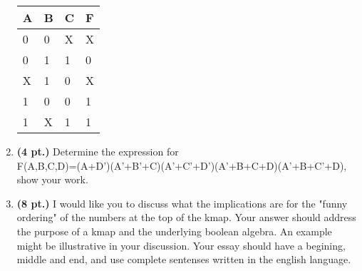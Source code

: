 \documentclass{article}
\begin{document}
\begin{enumerate}
\begin{tabular}{l|l|l||l}
A & B & C & F \\ \hline \hline
0 & 0 & X & X \\ \hline
0 & 1 & 1 & 0 \\ \hline
X & 1 & 0 & X \\ \hline
1 & 0 & 0 & 1 \\ \hline
1 & X & 1 & 1 \\ 
\end{tabular}

\item {\bf (4 pt.)} Determine the \SOPmin expression for \\
F(A,B,C,D)=(A+D')(A'+B'+C)(A'+C'+D')(A'+B+C+D)(A'+B+C'+D),
show your work.
\pagebreak
\item{\bf (8 pt.)} I would like you to discuss what the implications
are for the "funny ordering" of the numbers at the top of the kmap.
Your answer should address the purpose of a kmap and the underlying
boolean algebra.  An example might be illustrative in your discussion.
Your essay should have a begining, middle and end, and use complete
sentenses written in the english language. \\


\end{enumerate}
\end{document}
